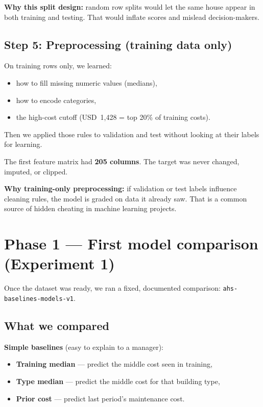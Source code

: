 \documentclass[11pt,a4paper]{article}
\begin{document}
\textbf{Why this split design:} random row splits would let the same house appear in both training and testing. That would inflate scores and mislead decision-makers.

\subsection{Step 5: Preprocessing (training data only)}

On training rows only, we learned:
\begin{itemize}
  \item how to fill missing numeric values (medians),
  \item how to encode categories,
  \item the high-cost cutoff (USD~1,428 = top 20\% of training costs).
\end{itemize}

Then we applied those rules to validation and test without looking at their labels for learning.

The first feature matrix had \textbf{205 columns}. The target was never changed, imputed, or clipped.

\textbf{Why training-only preprocessing:} if validation or test labels influence cleaning rules, the model is graded on data it already saw. That is a common source of hidden cheating in machine learning projects.

\section{Phase 1 --- First model comparison (Experiment 1)}

Once the dataset was ready, we ran a fixed, documented comparison: \texttt{ahs-baselines-models-v1}.

\subsection{What we compared}

\textbf{Simple baselines} (easy to explain to a manager):
\begin{itemize}
  \item \textbf{Training median} --- predict the middle cost seen in training,
  \item \textbf{Type median} --- predict the middle cost for that building type,
  \item \textbf{Prior cost} --- predict last period's maintenance cost.
\end{itemize}
\end{document}
